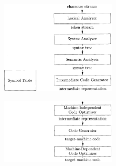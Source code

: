 \begin{frame}{}
\begin{figure}[H]
\begin{center}
\includegraphics[width=0.5\textwidth, height=0.8\textheight, angle=-0.5]{docs/images/front}
\end{center}
\end{figure}
\end{frame}

\begin{frame}{}
\begin{figure}[H]
\begin{center}
\includegraphics[width=0.5\textwidth, height=0.6\textheight, angle=-0.5]{docs/images/back}
\end{center}
\end{figure}
\end{frame}
